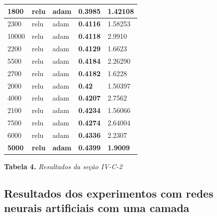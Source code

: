 \documentclass[conference]{IEEEtran}
\begin{document}
\begin{center}
\begin{tabular}{| l | l | l | l | l |}
1800                    & relu                   & adam                   & \textbf{0.3985}        & 1.42108         \\ \hline
2300                    & relu                   & adam                   & \textbf{0.4116}        & 1.58253         \\ \hline
10000                   & relu                   & adam                   & \textbf{0.4118}        & 2.9910          \\ \hline
2200                    & relu                   & adam                   & \textbf{0.4129}        & 1.6623          \\ \hline
5500                    & relu                   & adam                   & \textbf{0.4184}        & 2.26290         \\ \hline
2700                    & relu                   & adam                   & \textbf{0.4182}         & 1.6228         \\ \hline
2000                    & relu                   & adam                   & \textbf{0.42}          & 1.50397         \\ \hline 
4000                    & relu                   & adam                   & \textbf{0.4207}        & 2.7562          \\ \hline
2100                    & relu                   & adam                   & \textbf{0.4234}        & 1.56066         \\ \hline
7500                    & relu                   & adam                   & \textbf{0.4274}        & 2.64004         \\ \hline
6000                    & relu                   & adam                   & \textbf{0.4336}        & 2.2307          \\ \hline
\textbf{5000}           & \textbf{relu}          & \textbf{adam}          & \textbf{0.4399}        & \textbf{1.9009} \\ \hline
    \end{tabular}
\newline
    
\textbf{Tabela 4. }\textit{Resultados da seção IV-C-2}

\end{center}

\subsection{Resultados dos experimentos com redes neurais artificiais com uma camada}
\end{document}
